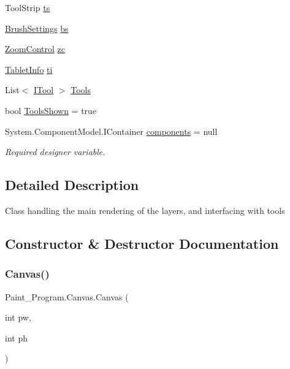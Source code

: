 \begin{DoxyCompactItemize}
\item 
Tool\+Strip \mbox{\hyperlink{class_paint___program_1_1_canvas_a25f473e57732815bbfd29ece6c8d9e1a}{ts}}
\item 
\mbox{\hyperlink{class_paint___program_1_1_brush_settings}{Brush\+Settings}} \mbox{\hyperlink{class_paint___program_1_1_canvas_a8d4ab120fa6b6a09a21550b9c529ee32}{bs}}
\item 
\mbox{\hyperlink{class_paint___program_1_1_zoom_control}{Zoom\+Control}} \mbox{\hyperlink{class_paint___program_1_1_canvas_ae476a361419679063d08d82be0d75586}{zc}}
\item 
\mbox{\hyperlink{class_paint___program_1_1_tablet_info}{Tablet\+Info}} \mbox{\hyperlink{class_paint___program_1_1_canvas_a82ed26ab78c420733a97cbf4b70cd0c1}{ti}}
\item 
List$<$ \mbox{\hyperlink{interface_paint___program_1_1_i_tool}{I\+Tool}} $>$ \mbox{\hyperlink{class_paint___program_1_1_canvas_aa4c39db74d3d28be21479042ebbb5ac1}{Tools}}
\item 
bool \mbox{\hyperlink{class_paint___program_1_1_canvas_a6b215f6b92ac2e3215da878200ce02b6}{Tools\+Shown}} = true
\item 
System.\+Component\+Model.\+I\+Container \mbox{\hyperlink{class_paint___program_1_1_canvas_a669e31bb19fca7ec4eaa939d5068eed4}{components}} = null
\begin{DoxyCompactList}\small\item\em Required designer variable. \end{DoxyCompactList}\end{DoxyCompactItemize}


\subsection{Detailed Description}
Class handling the main rendering of the layers, and interfacing with tools 



\subsection{Constructor \& Destructor Documentation}
\mbox{\label{class_paint___program_1_1_canvas_add693d71442d497fe310ccab15a4b22f}} 
\subsubsection{\texorpdfstring{Canvas()}{Canvas()}\hspace{0.1cm}{\footnotesize\ttfamily [1/2]}}
{\footnotesize\ttfamily Paint\+\_\+\+Program.\+Canvas.\+Canvas (\begin{DoxyParamCaption}\item[{int}]{pw,  }\item[{int}]{ph }\end{DoxyParamCaption})\hspace{0.3cm}{\ttfamily [inline]}}

